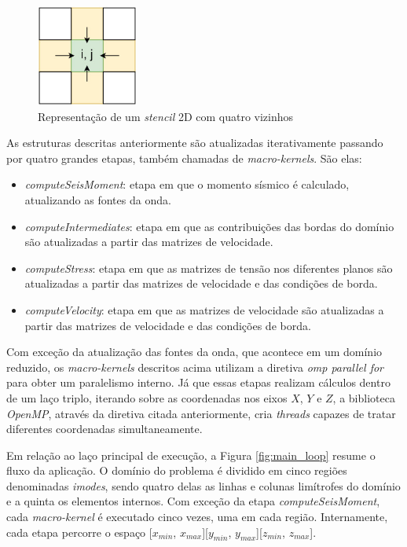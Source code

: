\documentclass[cic,tc]{iiufrgs}
\begin{document}
\begin{figure}[!htb]
    \caption{Representação de um \textit{stencil} 2D com quatro vizinhos}
    \begin{center}
      \includegraphics[width=9em]{stencil}
    \end{center}
    \label{fig:stencil}
\end{figure}

As estruturas descritas anteriormente são atualizadas iterativamente passando por quatro grandes etapas, também chamadas de \textit{macro-kernels}. São elas:

\begin{itemize}
\item{\textit{computeSeisMoment}:} etapa em que o momento sísmico é calculado, atualizando as fontes da onda.
\item{\textit{computeIntermediates}:} etapa em que as contribuições das bordas do domínio são atualizadas a partir das matrizes de velocidade.
\item{\textit{computeStress}:} etapa em que as matrizes de tensão nos diferentes planos são atualizadas a partir das matrizes de velocidade e das condições de borda.
\item{\textit{computeVelocity}:} etapa em que as matrizes de velocidade são atualizadas a partir das matrizes de velocidade e das condições de borda.
\end{itemize}

Com exceção da atualização das fontes da onda, que acontece em um domínio reduzido, os \textit{macro-kernels} descritos acima utilizam a diretiva \textit{omp parallel for}
para obter um paralelismo interno. Já que essas etapas realizam cálculos dentro de um laço triplo, iterando sobre as coordenadas nos eixos $X$, $Y$ e $Z$, a biblioteca \textit{OpenMP},
através da diretiva citada anteriormente, cria \textit{threads} capazes de tratar diferentes coordenadas simultaneamente.

Em relação ao laço principal de execução, a Figura \ref{fig:main_loop} resume o fluxo da aplicação. O domínio do problema é dividido em cinco regiões denominadas \textit{imodes},
sendo quatro delas as linhas e colunas limítrofes do domínio e a quinta os elementos internos. Com exceção da etapa \textit{computeSeisMoment}, cada \textit{macro-kernel} é executado cinco
vezes, uma em cada região. Internamente, cada etapa percorre o espaço [$x_{min}$, $x_{max}$][$y_{min}$, $y_{max}$][$z_{min}$, $z_{max}$].
\end{document}
